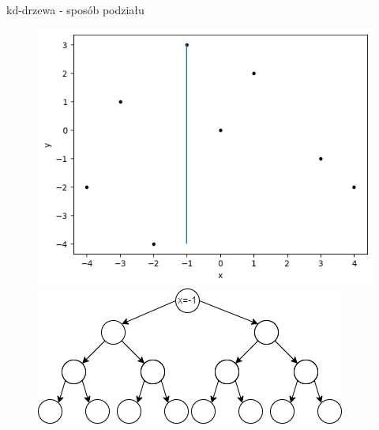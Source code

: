 \documentclass[aspectratio=169,dvipsnames]{beamer}
\begin{document}
\begin{frame}{kd-drzewa - sposób podziału}
    \begin{figure}[H]
        \centering
          \begin{minipage}{0.5\textwidth}
            \centering
            \includegraphics[width=\linewidth]{images/plots/2.png}
          \end{minipage}%
          \begin{minipage}{0.5\textwidth}
            \centering
            \includegraphics[width=\linewidth]{images/trees/2.drawio.png}
          \end{minipage}
    \end{figure}
\end{frame}
\end{document}
